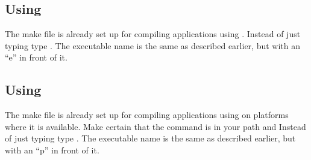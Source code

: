 \subsection{Using }

The make file is already set up for compiling applications using 
. Instead of just typing  type 
. The executable name is the same as described
earlier, but with an ``e'' in front of it.

\subsection{Using }

The make file is already set up for compiling applications using 
 on platforms where it is available. Make certain that the
command is in your path and Instead of just typing  type 
. The executable name is the same as described
earlier, but with an ``p'' in front of it.

